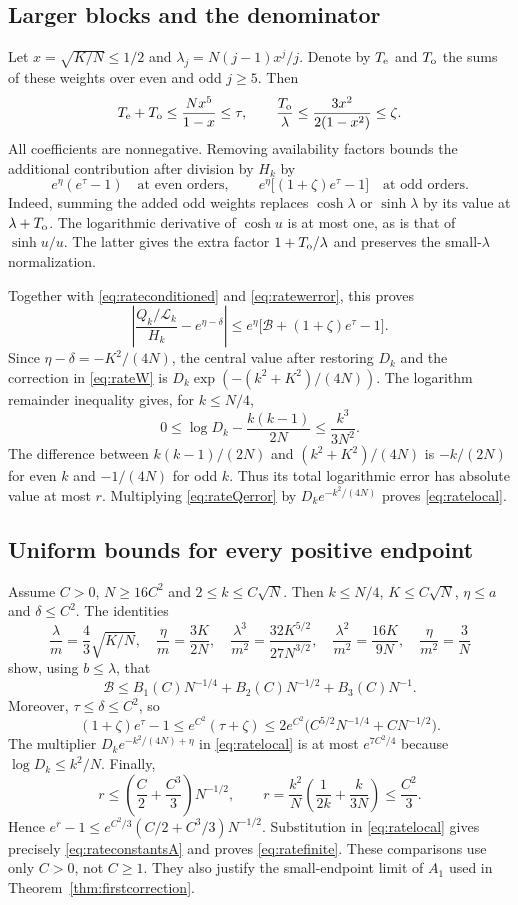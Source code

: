 \subsection{Larger blocks and the denominator}

Let $x=\sqrt{K/N}\le1/2$ and $\lambda_j=N(j-1)x^j/j$. Denote by $T_{\rm e}$ and $T_{\rm o}$ the sums of these weights over even and odd $j\ge5$. Then
\[
T_{\rm e}+T_{\rm o}\le\frac{Nx^5}{1-x}\le\tau,
\qquad
\frac{T_{\rm o}}\lambda\le\frac{3x^2}{2(1-x^2)}\le\zeta.
\]
All coefficients are nonnegative. Removing availability factors bounds the additional contribution after division by $H_k$ by
\[
e^\eta(e^\tau-1)
\quad\text{at even orders},\qquad
e^\eta\bigl[(1+\zeta)e^\tau-1\bigr]
\quad\text{at odd orders}.
\]
Indeed, summing the added odd weights replaces $\cosh\lambda$ or $\sinh\lambda$ by its value at $\lambda+T_{\rm o}$. The logarithmic derivative of $\cosh u$ is at most one, as is that of $\sinh u/u$. The latter gives the extra factor $1+T_{\rm o}/\lambda$ and preserves the small-$\lambda$ normalization.

Together with \eqref{eq:rateconditioned} and \eqref{eq:ratewerror}, this proves
\begin{equation}\label{eq:rateQerror}
\left|\frac{Q_k/\mathcal L_k}{H_k}-e^{\eta-\delta}\right|
\le e^\eta\bigl[\mathcal B+(1+\zeta)e^\tau-1\bigr].
\end{equation}
Since $\eta-\delta=-K^2/(4N)$, the central value after restoring $D_k$ and the correction in \eqref{eq:rateW} is
$D_k\exp(-(k^2+K^2)/(4N))$.
The logarithm remainder inequality gives, for $k\le N/4$,
\[
0\le\log D_k-\frac{k(k-1)}{2N}\le\frac{k^3}{3N^2}.
\]
The difference between $k(k-1)/(2N)$ and $(k^2+K^2)/(4N)$ is $-k/(2N)$ for even $k$ and $-1/(4N)$ for odd $k$. Thus its total logarithmic error has absolute value at most $r$. Multiplying \eqref{eq:rateQerror} by $D_ke^{-k^2/(4N)}$ proves \eqref{eq:ratelocal}.

\subsection{Uniform bounds for every positive endpoint}

Assume $C>0$, $N\ge16C^2$ and $2\le k\le C\sqrt N$. Then $k\le N/4$, $K\le C\sqrt N$, $\eta\le a$ and $\delta\le C^2$. The identities
\[
\frac\lambda m=\frac43\sqrt{K/N},\quad
\frac\eta m=\frac{3K}{2N},\quad
\frac{\lambda^3}{m^2}=\frac{32K^{5/2}}{27N^{3/2}},\quad
\frac{\lambda^2}{m^2}=\frac{16K}{9N},\quad
\frac\eta{m^2}=\frac3N
\]
show, using $b\le\lambda$, that
\[
\mathcal B\le B_1(C)N^{-1/4}+B_2(C)N^{-1/2}+B_3(C)N^{-1}.
\]
Moreover, $\tau\le\delta\le C^2$, so
\[
(1+\zeta)e^\tau-1
\le e^{C^2}(\tau+\zeta)
\le2e^{C^2}\bigl(C^{5/2}N^{-1/4}+CN^{-1/2}\bigr).
\]
The multiplier $D_ke^{-k^2/(4N)+\eta}$ in \eqref{eq:ratelocal} is at most $e^{7C^2/4}$ because $\log D_k\le k^2/N$. Finally,
\[
r\le\left(\frac C2+\frac{C^3}{3}\right)N^{-1/2},\qquad
r=\frac{k^2}{N}\left(\frac1{2k}+\frac{k}{3N}\right)\le\frac{C^2}{3}.
\]
Hence $e^r-1\le e^{C^2/3}(C/2+C^3/3)N^{-1/2}$. Substitution in \eqref{eq:ratelocal} gives precisely \eqref{eq:rateconstantsA} and proves \eqref{eq:ratefinite}. These comparisons use only $C>0$, not $C\ge1$. They also justify the small-endpoint limit of $A_1$ used in Theorem~\ref{thm:firstcorrection}.
